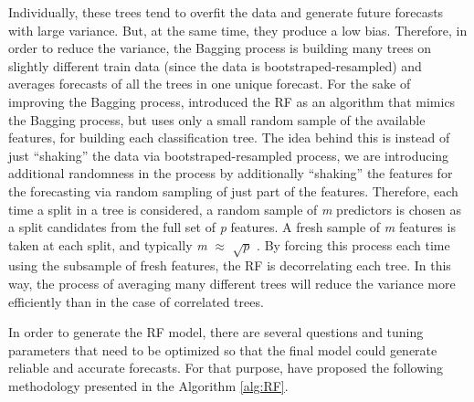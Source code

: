 \documentclass[]{elsarticle} %
\begin{document}
Individually, these trees tend to overfit the data and generate future
forecasts with large variance. But, at the same time, they produce a low
bias. Therefore, in order to reduce the variance, the Bagging process is
building many trees on slightly different train data (since the data is
bootstraped-resampled) and averages forecasts of all the trees in one
unique forecast. For the sake of improving the Bagging process,
\citet{breiman2001random} introduced the RF as an algorithm that mimics
the Bagging process, but uses only a small random sample of the
available features, for building each classification tree. The idea
behind this is instead of just ``shaking'' the data via
bootstraped-resampled process, we are introducing additional randomness
in the process by additionally ``shaking'' the features for the
forecasting via random sampling of just part of the features. Therefore,
each time a split in a tree is considered, a random sample of \emph{m}
predictors is chosen as a split candidates from the full set of \emph{p}
features. A fresh sample of \emph{m} features is taken at each split,
and typically \emph{m} \(\approx\) \(\sqrt p\)
\citep{friedman2001elements}. By forcing this process each time using
the subsample of fresh features, the RF is decorrelating each tree. In
this way, the process of averaging many different trees will reduce the
variance more efficiently than in the case of correlated trees.

In order to generate the RF model, there are several questions and
tuning parameters that need to be optimized so that the final model
could generate reliable and accurate forecasts. For that purpose,
\citet{friedman2001elements} have proposed the following methodology
presented in the Algorithm \ref{alg:RF}.
\end{document}
